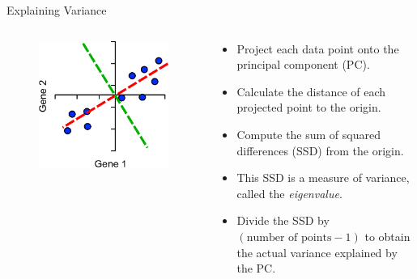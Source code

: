 \begin{frame}[allowframebreaks]{Explaining Variance}
    \begin{columns}
    \begin{column}{0.5\textwidth}
        \begin{figure}
            \centering
            \includegraphics[width=1\textwidth,keepaspectratio]{images/dul/dim-reduce/variance-explained.png}
        \end{figure}
    \end{column}
    \begin{column}{0.5\textwidth}
        \begin{itemize}
            \item Project each data point onto the principal component (PC).
            \item Calculate the distance of each projected point to the origin.
            \item Compute the sum of squared differences (SSD) from the origin.
            \item This SSD is a measure of variance, called the \textit{eigenvalue}.
            \item Divide the SSD by $(\text{number of points} - 1)$ to obtain the actual variance explained by the PC.
        \end{itemize}
    \end{column}
    \end{columns}


\end{frame}
